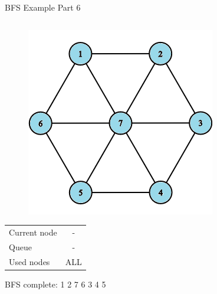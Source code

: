 \documentclass[aspectratio=169]{beamer}%
\begin{document}
\begin{frame}{BFS Example Part 6}
\begin{columns}
\begin{column}{0.32\textwidth}
\begin{figure}[!ht]
                \centering
                \includegraphics[width=0.9\linewidth]{bfs 18.png}
            \end{figure}
            \begin{table}[ht]
                \centering
                \begin{tabular}{l c}
                    Current node & -\\
                    Queue & -\\ 
                    Used nodes & ALL\\
                \end{tabular}
            \end{table}
            BFS complete: 1 2 7 6 3 4 5\\
        \end{column}
    \end{columns}
\end{frame}
\end{document}
